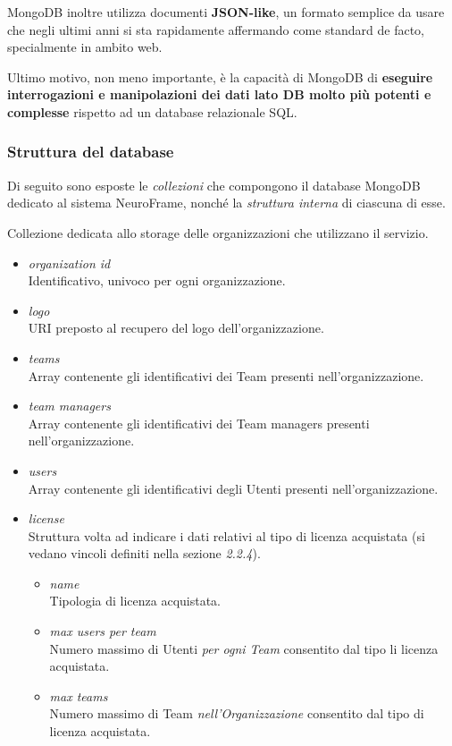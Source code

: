 \noindent MongoDB inoltre utilizza documenti {\bf JSON-like}, un formato semplice da usare che negli ultimi anni si sta rapidamente affermando come standard de facto, specialmente in ambito web.\newline 

\noindent Ultimo motivo, non meno importante, è la capacità di MongoDB di {\bf eseguire interrogazioni e manipolazioni dei dati lato DB molto più potenti e complesse} rispetto ad un database relazionale SQL.
\subsubsection{Struttura del database}
Di seguito sono esposte le \emph{collezioni} che compongono il database MongoDB dedicato al sistema NeuroFrame, nonché la \emph{struttura interna} di ciascuna di esse.\newline

\newline
Collezione dedicata allo storage delle organizzazioni che utilizzano il servizio.
\begin{itemize}
  \item \emph{organization id}\\
  {Identificativo, univoco per ogni organizzazione.}
  \item \emph{logo}\\
  {URI preposto al recupero del logo dell'organizzazione.}
  \item \emph{teams}\\
  {Array contenente gli identificativi dei Team presenti nell'organizzazione.}
  \item \emph{team managers}\\
  {Array contenente gli identificativi dei Team managers presenti nell'organizzazione.}
  \item \emph{users}\\
  {Array contenente gli identificativi degli Utenti presenti nell'organizzazione.}
  \item \emph{license}\\
  {Struttura volta ad indicare i dati relativi al tipo di licenza acquistata (si vedano vincoli definiti nella sezione \emph{2.2.4}).}
  {\begin{itemize}
    \item \emph{name}\\
    {Tipologia di licenza acquistata.}
    \item \emph{max users per team}\\
    {Numero massimo di Utenti \emph{per ogni Team} consentito dal tipo li licenza acquistata.}
    \item \emph{max teams}\\
    {Numero massimo di Team \emph{nell'Organizzazione} consentito dal tipo di licenza acquistata.}
  \end{itemize}}
\end{itemize}

